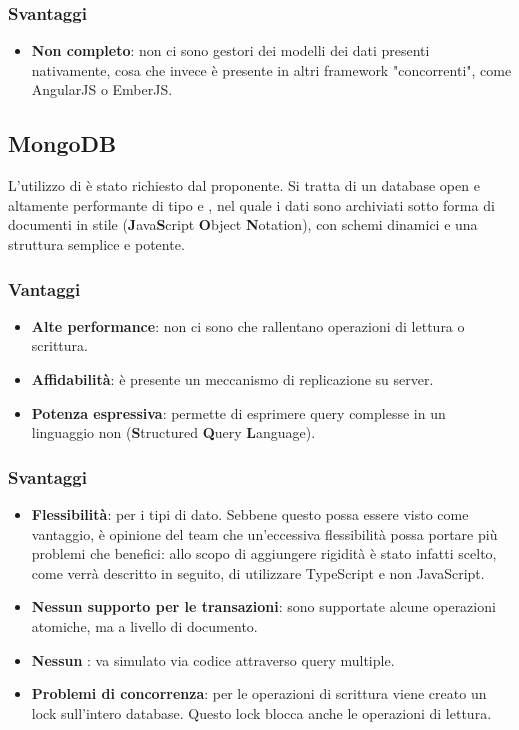\subsubsection{Svantaggi}
\begin{itemize}
\item \textbf{Non completo}: non ci sono gestori dei modelli dei dati presenti nativamente, cosa che invece è presente in altri framework "concorrenti", come AngularJS o EmberJS.
\end{itemize}
\subsection{MongoDB}
L'utilizzo di  \`e stato richiesto dal proponente. Si tratta di un database  open   e altamente performante di tipo  e , nel quale i dati sono archiviati sotto forma di documenti in stile  (\textbf{J}ava\textbf{S}cript \textbf{O}bject \textbf{N}otation), con schemi dinamici e una struttura semplice e potente.
\subsubsection{Vantaggi}
\begin{itemize}
\item \textbf{Alte performance}: non ci sono  che rallentano operazioni di lettura o scrittura. 
\item \textbf{Affidabilità}: \`e presente un meccanismo di replicazione su server.
\item \textbf{Potenza espressiva}: permette di esprimere query complesse in un linguaggio non  (\textbf{S}tructured \textbf{Q}uery \textbf{L}anguage).
\end{itemize}
\subsubsection{Svantaggi}
\begin{itemize}
\item \textbf{Flessibilità}: per i tipi di dato. Sebbene questo possa essere visto come vantaggio, è opinione del team che un'eccessiva flessibilità possa portare più problemi che benefici: allo scopo di aggiungere rigidità è stato infatti scelto, come verrà descritto in seguito, di utilizzare TypeScript e non JavaScript.
\item \textbf{Nessun supporto per le transazioni}: sono supportate alcune operazioni atomiche, ma a livello di documento.
\item \textbf{Nessun }: va simulato via codice attraverso query multiple.
\item \textbf{Problemi di concorrenza}: per le operazioni di scrittura viene creato un lock sull'intero database. Questo lock blocca anche le operazioni di lettura.
\end{itemize}
